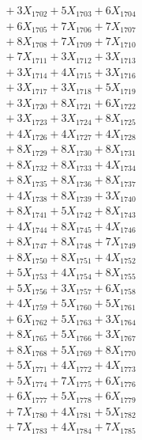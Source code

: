\documentclass[a4paper,10pt]{article}
\begin{document}
{\begin{align}
&\;  + 3 X_{1702} + 5 X_{1703} + 6 X_{1704} \\[0.3ex]
&\;  + 6 X_{1705} + 7 X_{1706} + 7 X_{1707} \\[0.3ex]
&\;  + 8 X_{1708} + 7 X_{1709} + 7 X_{1710} \\[0.3ex]
&\;  + 7 X_{1711} + 3 X_{1712} + 3 X_{1713} \\[0.3ex]
&\;  + 3 X_{1714} + 4 X_{1715} + 3 X_{1716} \\[0.3ex]
&\;  + 3 X_{1717} + 3 X_{1718} + 5 X_{1719} \\[0.5ex]\allowbreak
&\;  + 3 X_{1720} + 8 X_{1721} + 6 X_{1722} \\[0.3ex]
&\;  + 3 X_{1723} + 3 X_{1724} + 8 X_{1725} \\[0.3ex]
&\;  + 4 X_{1726} + 4 X_{1727} + 4 X_{1728} \\[0.3ex]
&\;  + 8 X_{1729} + 8 X_{1730} + 8 X_{1731} \\[0.3ex]
&\;  + 8 X_{1732} + 8 X_{1733} + 4 X_{1734} \\[0.3ex]
&\;  + 8 X_{1735} + 8 X_{1736} + 8 X_{1737} \\[0.3ex]
&\;  + 4 X_{1738} + 8 X_{1739} + 3 X_{1740} \\[0.3ex]
&\;  + 8 X_{1741} + 5 X_{1742} + 8 X_{1743} \\[0.3ex]
&\;  + 4 X_{1744} + 8 X_{1745} + 4 X_{1746} \\[0.3ex]
&\;  + 8 X_{1747} + 8 X_{1748} + 7 X_{1749} \\[0.5ex]\allowbreak
&\;  + 8 X_{1750} + 8 X_{1751} + 4 X_{1752} \\[0.3ex]
&\;  + 5 X_{1753} + 4 X_{1754} + 8 X_{1755} \\[0.3ex]
&\;  + 5 X_{1756} + 3 X_{1757} + 6 X_{1758} \\[0.3ex]
&\;  + 4 X_{1759} + 5 X_{1760} + 5 X_{1761} \\[0.3ex]
&\;  + 6 X_{1762} + 5 X_{1763} + 3 X_{1764} \\[0.3ex]
&\;  + 8 X_{1765} + 5 X_{1766} + 3 X_{1767} \\[0.3ex]
&\;  + 8 X_{1768} + 5 X_{1769} + 8 X_{1770} \\[0.3ex]
&\;  + 5 X_{1771} + 4 X_{1772} + 4 X_{1773} \\[0.3ex]
&\;  + 5 X_{1774} + 7 X_{1775} + 6 X_{1776} \\[0.3ex]
&\;  + 6 X_{1777} + 5 X_{1778} + 6 X_{1779} \\[0.5ex]\allowbreak
&\;  + 7 X_{1780} + 4 X_{1781} + 5 X_{1782} \\[0.3ex]
&\;  + 7 X_{1783} + 4 X_{1784} + 7 X_{1785} \\[0.3ex]

\end{align}}
\end{document}
